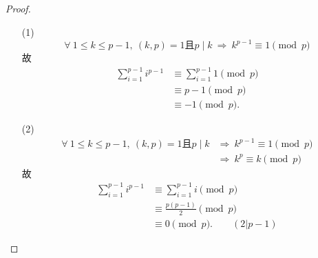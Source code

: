 \documentclass[UTF8]{ctexart}
\begin{document}
\subsection{}   %
\begin{proof}
    \begin{enumerate}
        \item []
        \item [(1)]
        \[
            \forall\ 1\leq k \leq p-1,\ 
            (k,p)=1\mbox{且}p\mid k
            \ \Rightarrow\ 
            k^{p-1} \equiv 1 \pmod{p}
        \]
        故
        \begin{align*}
            \sum\limits_{i=1}^{p-1} i^{p-1}
            & \equiv 
            \sum\limits_{i=1}^{p-1} 1 \pmod{p}\\
            & \equiv
            p-1 \pmod{p}\\
            & \equiv
            -1 \pmod{p}.
        \end{align*}
        \item [(2)]
        \begin{align*}
            \forall\ 1\leq k \leq p-1,\ 
            (k,p)=1\mbox{且}p\mid k
            & \Rightarrow\ 
            k^{p-1} \equiv 1 \pmod{p}\\
            & \Rightarrow\ 
            k^{p} \equiv k \pmod{p}
        \end{align*}
        故
        \begin{align*}
            \sum\limits_{i=1}^{p-1} i^{p-1}
            & \equiv 
            \sum\limits_{i=1}^{p-1} i \pmod{p}\\
            & \equiv
            \displaystyle{\frac{p(p-1)}{2}} \pmod{p}\\
            & \equiv
            0 \pmod{p}.\qquad (2|p-1)
        \end{align*}
    \end{enumerate}
\end{proof}

\subsection{}   %


\subsection{}   %


\subsection{}   %
\end{document}
